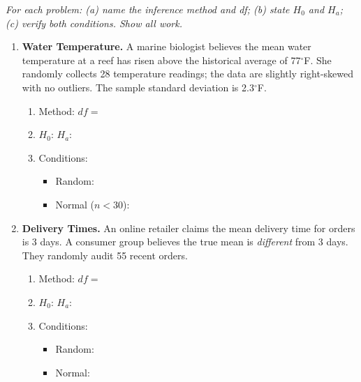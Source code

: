 \documentclass[10pt]{article}
\begin{document}
\namedateperiod

\vspace{0.15in}

\textit{For each problem: (a) name the inference method and df; (b) state $H_0$ and $H_a$;
(c) verify both conditions. Show all work.}

\begin{enumerate}

\item \textbf{Water Temperature.} \quad
A marine biologist believes the mean water temperature at a reef has risen above the historical
average of 77$^\circ$F. She randomly collects 28 temperature readings; the data are slightly
right-skewed with no outliers. The sample standard deviation is 2.3$^\circ$F.

\begin{enumerate}[label=\alph*.]
  \item Method: \blank{5.5cm} \quad $df = $ \blank{1.5cm}
  \item $H_0$: \blank{4.5cm} \quad $H_a$: \blank{4.5cm}
  \item Conditions:
        \begin{itemize}
          \item Random: \writeline
          \item Normal ($n < 30$): \writeline
        \end{itemize}
\end{enumerate}
\vspace{0.1in}

\item \textbf{Delivery Times.} \quad
An online retailer claims the mean delivery time for orders is 3 days. A consumer group
believes the true mean is \emph{different} from 3 days. They randomly audit 55 recent orders.

\begin{enumerate}[label=\alph*.]
  \item Method: \blank{5.5cm} \quad $df = $ \blank{1.5cm}
  \item $H_0$: \blank{4.5cm} \quad $H_a$: \blank{4.5cm}
  \item Conditions:
        \begin{itemize}
          \item Random: \writeline
          \item Normal: \writeline
        \end{itemize}
\end{enumerate}
\vspace{0.1in}


\end{enumerate}
\end{document}
